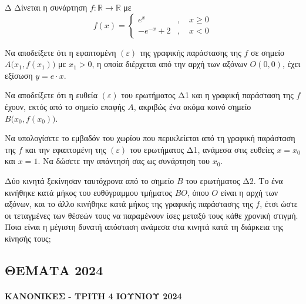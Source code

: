 \begin{thema}{Δ}
Δίνεται η συνάρτηση $f: \mathbb{R} \to \mathbb{R}$ με
\[
f(x) =
\begin{cases}
e^x & ,\quad x \geq 0 \\[4pt]
-e^{-x} + 2 & ,\quad x < 0
\end{cases}
\]
\begin{erwthma}
    \item Να αποδείξετε ότι η εφαπτομένη $(\varepsilon)$ της γραφικής παράστασης της $f$ σε σημείο $A\bigl(x_1, f(x_1)\bigr)$ με $x_1 > 0$, η οποία διέρχεται από την αρχή των αξόνων $O(0, 0)$, έχει εξίσωση $y = e \cdot x$. 

    \item Να αποδείξετε ότι η ευθεία $(\varepsilon)$ του ερωτήματος Δ1 και η γραφική παράσταση της $f$ έχουν, εκτός από το σημείο επαφής $A$, ακριβώς ένα ακόμα κοινό σημείο $B\bigl(x_0, f(x_0)\bigr)$. 

    \item Να υπολογίσετε το εμβαδόν του χωρίου που περικλείεται από τη γραφική παράσταση της $f$ και την εφαπτομένη της $(\varepsilon)$ του ερωτήματος Δ1, ανάμεσα στις ευθείες $x = x_0$ και $x = 1$. Να δώσετε την απάντησή σας ως συνάρτηση του $x_0$. 

    \item Δύο κινητά ξεκίνησαν ταυτόχρονα από το σημείο $B$ του ερωτήματος Δ2. Το ένα κινήθηκε κατά μήκος του ευθύγραμμου τμήματος $BO$, όπου $O$ είναι η αρχή των αξόνων, και το άλλο κινήθηκε κατά μήκος της γραφικής παράστασης της $f$, έτσι ώστε οι τεταγμένες των θέσεών τους να παραμένουν ίσες μεταξύ τους κάθε χρονική στιγμή. Ποια είναι η μέγιστη δυνατή απόσταση ανάμεσα στα κινητά κατά τη διάρκεια της κίνησής τους; 
\end{erwthma}
\end{thema}

\subsection{ΘΕΜΑΤΑ 2024}
\paragraph{ΚΑΝΟΝΙΚΕΣ - ΤΡΙΤΗ 4 ΙΟΥΝΙΟΥ 2024}

